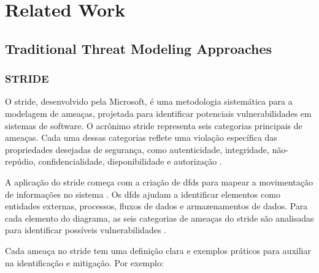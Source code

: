 
%

\chapter{Related Work}
\label{cha:related_work}

\glsresetall

\section{Traditional Threat Modeling Approaches}
\label{sec:traditional_threat_modeling}

\subsection{STRIDE}
\label{subsec:stride}

O \gls{stride}, desenvolvido pela Microsoft, é uma metodologia sistemática
para a modelagem de ameaças, projetada para identificar potenciais
vulnerabilidades em sistemas de software. O acrônimo \gls{stride} representa
seis categorias principais de ameaças\cite{ThreatModelingdesigningForSecurity}.
Cada uma dessas categorias reflete uma violação específica das
propriedades desejadas de segurança, como autenticidade,
integridade, não-repúdio, confidencialidade, disponibilidade e autorização
\cite{MicrosoftThreatModelingTechnique}.

A aplicação do \gls{stride} começa com a criação de \gls{dfds}
para mapear a movimentação de informações no sistema
\cite{UncoverSecurityDesignFlawsSTRIDE}. Os \gls{dfds} ajudam a identificar
elementos como entidades externas, processos, fluxos de dados e
armazenamentos de dados. Para cada elemento do diagrama, as seis
categorias de ameaças do \gls{stride} são analisadas para identificar
possíveis vulnerabilidades \cite{ThreatModelingdesigningForSecurity}.

Cada ameaça no \gls{stride} tem uma definição clara e exemplos práticos para
auxiliar na identificação e mitigação. Por exemplo:

